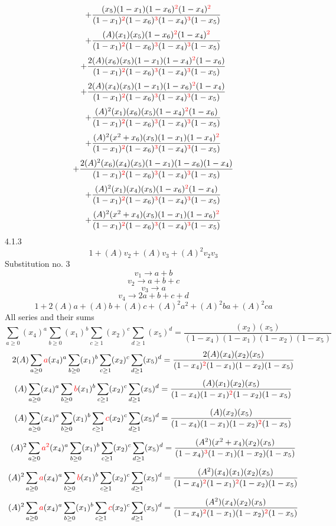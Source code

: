 \documentclass{article}
\begin{document}
\[+\frac{(x_5)(1-x_1)(1-x_6)^{\textcolor{red}{2}}(1-x_4)^{\textcolor{red}{2}}}{(1-x_1)^{\textcolor{red}{2}}(1-x_6)^{\textcolor{red}{3}}(1-x_4)^{\textcolor{red}{3}}(1-x_5)}\]\[+\frac{(A)(x_1)(x_5)(1-x_6)^{\textcolor{red}{2}}(1-x_4)^{\textcolor{red}{2}}}{(1-x_1)^{\textcolor{red}{2}}(1-x_6)^{\textcolor{red}{3}}(1-x_4)^{\textcolor{red}{3}}(1-x_5)}\]\[+\frac{2(A)(x_6)(x_5)(1-x_1)(1-x_4)^{\textcolor{red}{2}}(1-x_6)}{(1-x_1)^{\textcolor{red}{2}}(1-x_6)^{\textcolor{red}{3}}(1-x_4)^{\textcolor{red}{3}}(1-x_5)}\]\[+\frac{2(A)(x_4)(x_5)(1-x_1)(1-x_6)^{\textcolor{red}{2}}(1-x_4)}{(1-x_1)^{\textcolor{red}{2}}(1-x_6)^{\textcolor{red}{3}}(1-x_4)^{\textcolor{red}{3}}(1-x_5)}\]\[+\frac{(A)^{2}(x_1)(x_6)(x_5)(1-x_4)^{\textcolor{red}{2}}(1-x_6)}{(1-x_1)^{\textcolor{red}{2}}(1-x_6)^{\textcolor{red}{3}}(1-x_4)^{\textcolor{red}{3}}(1-x_5)}\]\[+\frac{(A)^{2}(x^{2}+x_6)(x_5)(1-x_1)(1-x_4)^{\textcolor{red}{2}}}{(1-x_1)^{\textcolor{red}{2}}(1-x_6)^{\textcolor{red}{3}}(1-x_4)^{\textcolor{red}{3}}(1-x_5)}\]\[+\frac{2(A)^{2}(x_6)(x_4)(x_5)(1-x_1)(1-x_6)(1-x_4)}{(1-x_1)^{\textcolor{red}{2}}(1-x_6)^{\textcolor{red}{3}}(1-x_4)^{\textcolor{red}{3}}(1-x_5)}\]\[+\frac{(A)^{2}(x_1)(x_4)(x_5)(1-x_6)^{\textcolor{red}{2}}(1-x_4)}{(1-x_1)^{\textcolor{red}{2}}(1-x_6)^{\textcolor{red}{3}}(1-x_4)^{\textcolor{red}{3}}(1-x_5)}\]\[+\frac{(A)^{2}(x^{2}+x_4)(x_5)(1-x_1)(1-x_6)^{\textcolor{red}{2}}}{(1-x_1)^{\textcolor{red}{2}}(1-x_6)^{\textcolor{red}{3}}(1-x_4)^{\textcolor{red}{3}}(1-x_5)}\]
4.1.3
\[1+(A)v_2+(A)v_3+(A)^2v_2v_3\]Substitution no. 3\[v_1\rightarrow{a+b}\]\[v_2\rightarrow{a+b+c}\]\[v_3\rightarrow{a}\]\[v_4\rightarrow{2a+b+c+d}\]\[1+2(A)a+(A)b+(A)c+(A)^2a^{2}+(A)^2ba+(A)^2ca\]All series and their sums\[\sum_{a\geq{0}}(x_4)^{a}\sum_{b\geq{0}}(x_1)^{b}\sum_{c\geq{1}}(x_2)^{c}\sum_{d\geq{1}}(x_5)^{d}=\frac{(x_2)(x_5)}{(1-x_4)(1-x_1)(1-x_2)(1-x_5)}\]\[2(A)\sum_{a\geq{0}}\textcolor{red}{a}(x_4)^{a}\sum_{b\geq{0}}(x_1)^{b}\sum_{c\geq{1}}(x_2)^{c}\sum_{d\geq{1}}(x_5)^{d}=\frac{2(A)(x_4)(x_2)(x_5)}{(1-x_4)^{\textcolor{red}{2}}(1-x_1)(1-x_2)(1-x_5)}\]\[(A)\sum_{a\geq{0}}(x_4)^{a}\sum_{b\geq{0}}\textcolor{red}{b}(x_1)^{b}\sum_{c\geq{1}}(x_2)^{c}\sum_{d\geq{1}}(x_5)^{d}=\frac{(A)(x_1)(x_2)(x_5)}{(1-x_4)(1-x_1)^{\textcolor{red}{2}}(1-x_2)(1-x_5)}\]\[(A)\sum_{a\geq{0}}(x_4)^{a}\sum_{b\geq{0}}(x_1)^{b}\sum_{c\geq{1}}\textcolor{red}{c}(x_2)^{c}\sum_{d\geq{1}}(x_5)^{d}=\frac{(A)(x_2)(x_5)}{(1-x_4)(1-x_1)(1-x_2)^{\textcolor{red}{2}}(1-x_5)}\]\[(A)^{2}\sum_{a\geq{0}}\textcolor{red}{a^{2}}(x_4)^{a}\sum_{b\geq{0}}(x_1)^{b}\sum_{c\geq{1}}(x_2)^{c}\sum_{d\geq{1}}(x_5)^{d}=\frac{(A^{2})(x^{2}+x_4)(x_2)(x_5)}{(1-x_4)^{\textcolor{red}{3}}(1-x_1)(1-x_2)(1-x_5)}\]\[(A)^{2}\sum_{a\geq{0}}\textcolor{red}{a}(x_4)^{a}\sum_{b\geq{0}}\textcolor{red}{b}(x_1)^{b}\sum_{c\geq{1}}(x_2)^{c}\sum_{d\geq{1}}(x_5)^{d}=\frac{(A^{2})(x_4)(x_1)(x_2)(x_5)}{(1-x_4)^{\textcolor{red}{2}}(1-x_1)^{\textcolor{red}{2}}(1-x_2)(1-x_5)}\]\[(A)^{2}\sum_{a\geq{0}}\textcolor{red}{a}(x_4)^{a}\sum_{b\geq{0}}(x_1)^{b}\sum_{c\geq{1}}\textcolor{red}{c}(x_2)^{c}\sum_{d\geq{1}}(x_5)^{d}=\frac{(A^{2})(x_4)(x_2)(x_5)}{(1-x_4)^{\textcolor{red}{2}}(1-x_1)(1-x_2)^{\textcolor{red}{2}}(1-x_5)}\]
\end{document}
